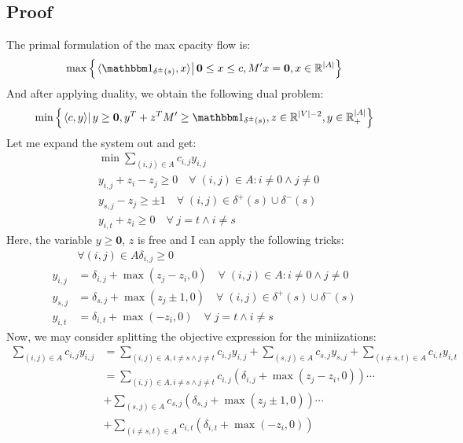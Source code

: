 \documentclass[]{article}
\theoremstyle{definition}
\begin{document}
    \subsection{Proof}
        The primal formulation of the max cpacity flow is: 
        \begin{align}
            \max\left\lbrace
            \left.
                \langle \mathbbm 1_{\delta^{\pm}(s)}, x\rangle
            \right|
            \mathbf 0 \le x \le c, M'x = \mathbf 0, x\in \mathbb R^{|A|}
            \right\rbrace
        \end{align}
        And after applying duality, we obtain the following dual problem: 
        \begin{align}
            \min\left\lbrace
                \left.\langle c, y\rangle\right|
                y\ge \mathbf 0, y^T+ z^TM'\ge \mathbbm 1_{\delta^\pm(s)}, z\in \mathbb R^{|V| - 2}, y\in \mathbb R^{|A|}_+
            \right\rbrace
        \end{align}
        Let me expand the system out and get: 
        \begin{align}
            & \min \sum_{(i, j)\in A}^{}c_{i,j} y_{i, j}
            \\
            & y_{i, j} + z_{i} - z_{j} \ge 0 \quad \forall\; (i, j)\in A: i\neq 0\wedge j\neq 0
            \\
            & y_{s, j} - z_j \ge \pm 1 \quad \forall\; (i, j) \in \delta^+(s)\cup \delta^-(s)
            \\
            & y_{i, t} + z_i\ge 0 \quad \forall\; j = t \wedge i \neq s
        \end{align}
        Here, the variable $y\ge \mathbf 0$, $z$ is free and I can apply the following tricks: 
        \begin{align}
            & \forall (i, j)\in A \delta_{i, j} \ge 0
            \\
            y_{i, j} &= \delta_{i, j} + \max(z_j - z_i, 0) \quad \forall\; (i, j)\in A: i\neq 0\wedge j\neq 0
            \\
            y_{s, j} &= \delta_{s, j} + \max(z_j \pm 1, 0) \quad \forall\; (i, j) \in \delta^+(s)\cup \delta^-(s)
            \\
            y_{i, t} &= \delta_{i, t} + \max(-z_i, 0) \quad \forall\; j = t \wedge i \neq s
        \end{align}
        Now, we may consider splitting the objective expression for the miniizations: 
        \begin{align}
            \sum_{(i, j)\in A}^{}c_{i, j}y_{i, j} &= 
            \sum_{(i, j)\in A, i\neq s \wedge j \neq t}^{}  
                c_{i,j}y_{i, j} + 
            \sum_{(s, j)\in A}^{} c_{s, j} y_{s, j} + 
            \sum_{(i \neq s, t)\in A}^{}c_{i, t} y_{i, t}
            \\
            &= 
            \sum_{(i, j)\in A, i\neq s \wedge j \neq t}^{}  
                c_{i, j}(\delta_{i, j} + \max(z_j - z_i, 0))\cdots 
            \\
            & + \sum_{(s, j)\in A}^{} c_{s, j} (\delta_{s, j} + \max(z_j \pm 1, 0))\cdots
            \\
            & + \sum_{(i \neq s, t)\in A}^{}c_{i, t}(\delta_{i, t} + \max(-z_i, 0))
        \end{align}
\end{document}
